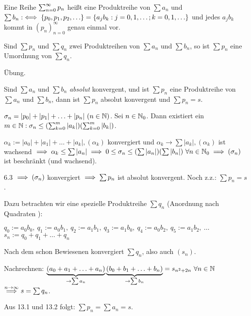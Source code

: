 \documentclass[a4paper,twoside,DIV15,BCOR12mm]{scrbook}
\begin{document}
\begin{definition}
Eine Reihe $\sum_{n=0}^{\infty}{p_n}$ heißt eine Produktreihe von $\sum{a_n}$ und $\sum{b_n} :\iff \{p_0,p_1,p_2,\ldots\} = \{a_j b_k: j=0,1,\ldots; k=0,1,\ldots\}$ und jedes $a_j b_k$ kommt in $(p_n)_{n=0}^{\infty}$ genau einmal vor.
\end{definition}

\begin{satz}
Sind $\sum{p_n}$ und $\sum{q_n}$ zwei Produktreihen von $\sum{a_n}$ und $\sum{b_n}$, so ist $\sum{p_n}$ eine Umordnung von $\sum{q_n}$.
\end{satz}

\begin{beweis}
Übung.
\end{beweis}

\begin{satz}
Sind $\sum{a_n}$ und $\sum{b_n}$ \emph{absolut} konvergent, und ist $\sum{p_n}$ eine Produktreihe von $\sum{a_n}$ und $\sum{b_n}$, dann ist $\sum{p_n}$ absolut konvergent und $\sum{p_n} = s$.
\end{satz}

\begin{beweis}
$\sigma_n = |p_0|+|p_1|+\ldots+|p_n|\ (n\in\MdN)$. Sei $n\in\mathbb{N}_0$. Dann existiert ein $m\in\mathbb{N}: \sigma_n \le (\sum_{k=0}^{m}{|a_k|})(\sum_{k=0}^{m}{|b_k|})$.

$\alpha_k := |a_0|+|a_1|+\ldots+|a_k|, (\alpha_k)$ konvergiert und $\alpha_k \to \sum{|a_k|}, (\alpha_k)$ ist wachsend $\implies \alpha_k \le \sum{|a_n|} \implies 0 \le \sigma_n \le (\sum{|a_n|})(\sum{|b_n|})\ \forall n\in\mathbb{N}_0 \implies (\sigma_n)$ ist beschränkt (und wachsend).

6.3 $\implies (\sigma_n)$ konvergiert $\implies \sum{p_n}$ ist absolut konvergent. Noch z.z.: $\sum{p_n} = s$.

Dazu betrachten wir eine spezielle Produktreihe $\sum{q_n}$ (\glqq Anordnung nach Quadraten \grqq):


$q_0 := a_0b_0,\ q_1 := a_0b_1,\ q_2 := a_1b_1,\ q_3 := a_1b_0,\ q_4 := a_0b_2,\ q_5 := a_1b_2,\ \ldots$ \\
$s_n := q_0+q_1+\ldots+q_n$

Nach dem schon Bewiesenen konvergiert $\sum{q_n}$, also auch $(s_n)$.

Nachrechnen: $\underbrace{(a_0+a_1+\ldots+a_n)}_{\to\sum{a_n}} \underbrace{(b_0+b_1+\ldots+b_n)}_{\to\sum{b_n}} = s_{n^2+2n}\ \forall n\in\mathbb{N}$\\
$\overset{n\to\infty}{\implies} s = \sum{q_n}$.

Aus 13.1 und 13.2 folgt: $\sum{p_n} = \sum{a_n} = s.$
\end{beweis}
\end{document}
